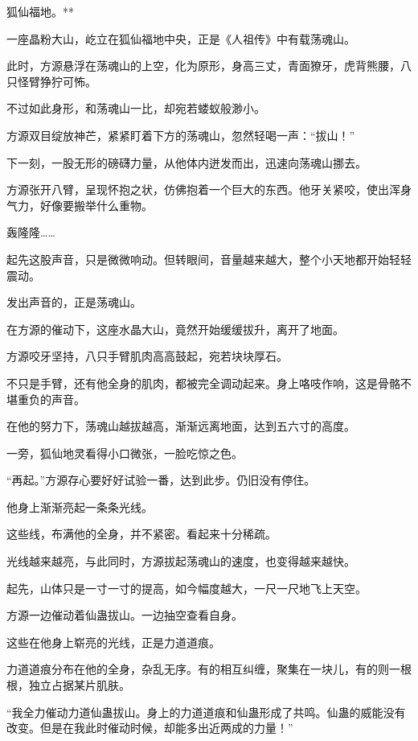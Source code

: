 
\begin{this_body}

狐仙福地。**

一座晶粉大山，屹立在狐仙福地中央，正是《人祖传》中有载荡魂山。

此时，方源悬浮在荡魂山的上空，化为原形，身高三丈，青面獠牙，虎背熊腰，八只怪臂狰狞可怖。

不过如此身形，和荡魂山一比，却宛若蝼蚁般渺小。

方源双目绽放神芒，紧紧盯着下方的荡魂山，忽然轻喝一声：“拔山！”

下一刻，一股无形的磅礴力量，从他体内迸发而出，迅速向荡魂山挪去。

方源张开八臂，呈现怀抱之状，仿佛抱着一个巨大的东西。他牙关紧咬，使出浑身气力，好像要搬举什么重物。

轰隆隆……

起先这股声音，只是微微响动。但转眼间，音量越来越大，整个小天地都开始轻轻震动。

发出声音的，正是荡魂山。

在方源的催动下，这座水晶大山，竟然开始缓缓拔升，离开了地面。

方源咬牙坚持，八只手臂肌肉高高鼓起，宛若块块厚石。

不只是手臂，还有他全身的肌肉，都被完全调动起来。身上咯吱作响，这是骨骼不堪重负的声音。

在他的努力下，荡魂山越拔越高，渐渐远离地面，达到五六寸的高度。

一旁，狐仙地灵看得小口微张，一脸吃惊之色。

“再起。”方源存心要好好试验一番，达到此步。仍旧没有停住。

他身上渐渐亮起一条条光线。

这些线，布满他的全身，并不紧密。看起来十分稀疏。

光线越来越亮，与此同时，方源拔起荡魂山的速度，也变得越来越快。

起先，山体只是一寸一寸的提高，如今幅度越大，一尺一尺地飞上天空。

方源一边催动着仙蛊拔山。一边抽空查看自身。

这些在他身上崭亮的光线，正是力道道痕。

力道道痕分布在他的全身，杂乱无序。有的相互纠缠，聚集在一块儿，有的则一根根，独立占据某片肌肤。

“我全力催动力道仙蛊拔山。身上的力道道痕和仙蛊形成了共鸣。仙蛊的威能没有改变。但是在我此时催动时候，却能多出近两成的力量！”


\end{this_body}

